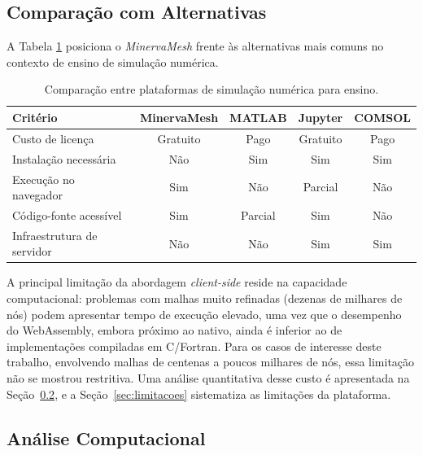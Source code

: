 \subsection{Comparação com Alternativas}
\label{sec:comparacao_alternativas}

A Tabela \ref{tab:comparacao_plataformas} posiciona o \textit{MinervaMesh} frente às alternativas mais comuns no contexto de ensino de simulação numérica.

\begin{table}[H]
\centering
\caption{Comparação entre plataformas de simulação numérica para ensino.}
\label{tab:comparacao_plataformas}
\begin{tabular}{lcccc}
\hline
\textbf{Critério} & \textbf{MinervaMesh} & \textbf{MATLAB} & \textbf{Jupyter} & \textbf{COMSOL} \\
\hline
Custo de licença           & Gratuito & Pago       & Gratuito   & Pago \\
Instalação necessária      & Não      & Sim        & Sim        & Sim \\
Execução no navegador      & Sim      & Não        & Parcial    & Não \\
Código-fonte acessível     & Sim      & Parcial    & Sim        & Não \\
Infraestrutura de servidor & Não      & Não        & Sim        & Sim \\
\hline
\end{tabular}
\end{table}

A principal limitação da abordagem \textit{client-side} reside na capacidade computacional: problemas com malhas muito refinadas (dezenas de milhares de nós) podem apresentar tempo de execução elevado, uma vez que o desempenho do WebAssembly, embora próximo ao nativo, ainda é inferior ao de implementações compiladas em C/Fortran. Para os casos de interesse deste trabalho, envolvendo malhas de centenas a poucos milhares de nós, essa limitação não se mostrou restritiva. Uma análise quantitativa desse custo é apresentada na Seção~\ref{sec:analise_computacional}, e a Seção~\ref{sec:limitacoes} sistematiza as limitações da plataforma.

\subsection{Análise Computacional}
\label{sec:analise_computacional}

